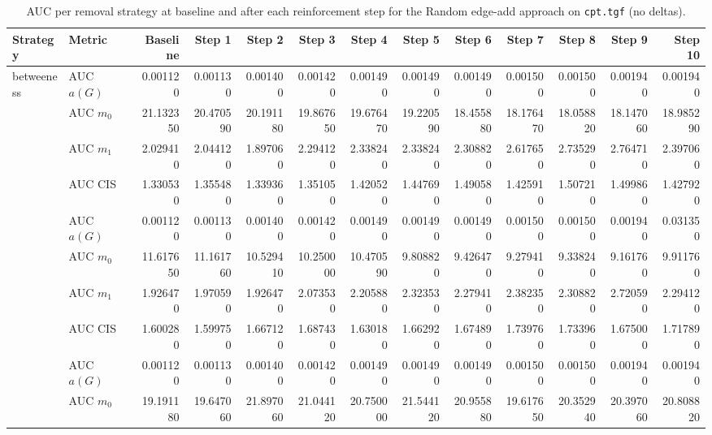 \begin{table}[htbp]
  \centering
  \caption{AUC per removal strategy at baseline and after each reinforcement step for the Random edge-add approach on \texttt{cpt.tgf} (no deltas).}
  \label{tab:cpt-random_add-auc}
\setlength{\tabcolsep}{2.5pt}
  \begin{tabular}{llrrrrrrrrrrr}
    \toprule
    \textbf{Strategy} & \textbf{Metric} & \textbf{Baseline} & \textbf{Step 1} & \textbf{Step 2} & \textbf{Step 3} & \textbf{Step 4} & \textbf{Step 5} & \textbf{Step 6} & \textbf{Step 7} & \textbf{Step 8} & \textbf{Step 9} & \textbf{Step 10} \\
    \midrule
    \multirow{4}{*}{betweeness} & AUC $a(G)$ & 0.001120 & 0.001130 & 0.001400 & 0.001420 & 0.001490 & 0.001490 & 0.001490 & 0.001500 & 0.001500 & 0.001940 & 0.001940 \\
    & AUC $m_0$ & 21.132350 & 20.470590 & 20.191180 & 19.867650 & 19.676470 & 19.220590 & 18.455880 & 18.176470 & 18.058820 & 18.147060 & 18.985290 \\
    & AUC $m_1$ & 2.029410 & 2.044120 & 1.897060 & 2.294120 & 2.338240 & 2.338240 & 2.308820 & 2.617650 & 2.735290 & 2.764710 & 2.397060 \\
    & AUC CIS & 1.330530 & 1.355480 & 1.339360 & 1.351050 & 1.420520 & 1.447690 & 1.490580 & 1.425910 & 1.507210 & 1.499860 & 1.427920 \\
    \addlinespace
    \multirow{4}{*}{closeness} & AUC $a(G)$ & 0.001120 & 0.001130 & 0.001400 & 0.001420 & 0.001490 & 0.001490 & 0.001490 & 0.001500 & 0.001500 & 0.001940 & 0.031350 \\
    & AUC $m_0$ & 11.617650 & 11.161760 & 10.529410 & 10.250000 & 10.470590 & 9.808820 & 9.426470 & 9.279410 & 9.338240 & 9.161760 & 9.911760 \\
    & AUC $m_1$ & 1.926470 & 1.970590 & 1.926470 & 2.073530 & 2.205880 & 2.323530 & 2.279410 & 2.382350 & 2.308820 & 2.720590 & 2.294120 \\
    & AUC CIS & 1.600280 & 1.599750 & 1.667120 & 1.687430 & 1.630180 & 1.662920 & 1.674890 & 1.739760 & 1.733960 & 1.675000 & 1.717890 \\
    \addlinespace
    \multirow{4}{*}{core influence} & AUC $a(G)$ & 0.001120 & 0.001130 & 0.001400 & 0.001420 & 0.001490 & 0.001490 & 0.001490 & 0.001500 & 0.001500 & 0.001940 & 0.001940 \\
    & AUC $m_0$ & 19.191180 & 19.647060 & 21.897060 & 21.044120 & 20.750000 & 21.544120 & 20.955880 & 19.617650 & 20.352940 & 20.397060 & 20.808820 \\

\end{tabular}
\end{table}
